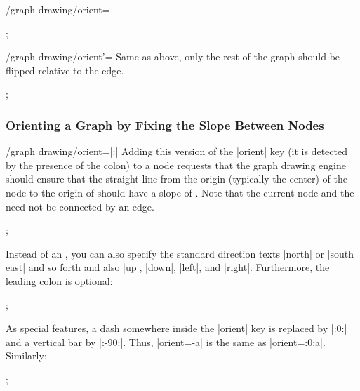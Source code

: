 {\begin{key}{/graph drawing/orient=}
\begin{codeexample}[]
\tikz {};
\end{codeexample}
\end{key}

\begin{key}{/graph drawing/orient'=}
  Same as above, only the rest of the graph should be flipped relative
  to the edge.
    
\begin{codeexample}[]
\tikz {};
\end{codeexample}
\end{key}


\subsubsection{Orienting a Graph by Fixing the Slope Between Nodes}

\begin{key}{/graph drawing/orient=\opt{|:|}|:|}
  Adding this version of the |orient| key (it is detected by the
  presence of the colon) to a node requests that the graph drawing
  engine should ensure that the straight line from the origin (typically
  the center) of the node to the origin of 
  should have a slope of . Note that the current node
  and the  need not be connected by an edge.
\begin{codeexample}[]
\tikz {};
\end{codeexample}
  
  Instead of an , you can also specify the standard
  direction texts |north| or |south east| and so forth and also
  |up|, |down|, |left|, and |right|. Furthermore, the leading colon is
  optional: 
\begin{codeexample}[]
\tikz {};
\end{codeexample}

  As special features, a dash somewhere inside the |orient| key is
  replaced by |:0:| and a vertical bar by |:-90:|. Thus, |orient=-a|
  is the same as |orient=:0:a|. Similarly:
\begin{codeexample}[]
\tikz {};
\end{codeexample}
\end{key}

}
